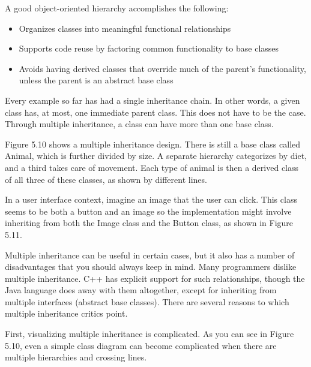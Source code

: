A good object-oriented hierarchy accomplishes the following:

\begin{itemize}
\item
Organizes classes into meaningful functional relationships

\item
Supports code reuse by factoring common functionality to base classes

\item
Avoids having derived classes that override much of the parent’s functionality, unless the parent is an abstract base class
\end{itemize}


Every example so far has had a single inheritance chain. In other words, a given class has, at most, one immediate parent class. This does not have to be the case. Through multiple inheritance, a class can have more than one base class.

Figure 5.10 shows a multiple inheritance design. There is still a base class called Animal, which is further divided by size. A separate hierarchy categorizes by diet, and a third takes care of movement. Each type of animal is then a derived class of all three of these classes, as shown by different lines.


In a user interface context, imagine an image that the user can click. This class seems to be both a button and an image so the implementation might involve inheriting from both the Image class and the Button class, as shown in Figure 5.11.


Multiple inheritance can be useful in certain cases, but it also has a number of disadvantages that you should always keep in mind. Many programmers dislike multiple inheritance. C++ has explicit support for such relationships, though the Java language does away with them altogether, except for inheriting from multiple interfaces (abstract base classes). There are several reasons to which multiple inheritance critics point.

First, visualizing multiple inheritance is complicated. As you can see in Figure 5.10, even a simple class diagram can become complicated when there are multiple hierarchies and crossing lines.

